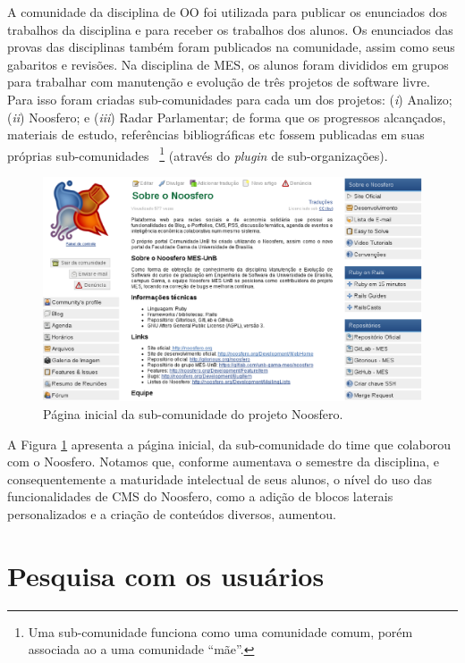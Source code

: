 A comunidade da disciplina de OO foi utilizada para  publicar os enunciados dos
trabalhos da disciplina e para receber os trabalhos dos alunos. Os enunciados
das provas das disciplinas também foram publicados na comunidade, assim como
seus gabaritos e revisões.
%
Na disciplina de MES, os alunos foram divididos em grupos para trabalhar com
manutenção e evolução de três projetos de software livre. Para isso foram
criadas sub-comunidades para cada um dos projetos:
%
(\textit{i}) Analizo;
(\textit{ii}) Noosfero;
e (\textit{iii}) Radar Parlamentar;
%
de forma que os progressos alcançados, materiais de estudo, referências
bibliográficas etc fossem publicadas em suas próprias sub-comunidades%
~\footnote{Uma sub-comunidade funciona como uma comunidade comum, porém
associada ao a uma comunidade ``mãe''.} (através do \textit{plugin} de
sub-organizações).

\begin{figure}[h!]
    \centering
    \includegraphics[keepaspectratio=true,scale=0.35]
      {figuras/Noosfero-MES.eps}
    \caption{Página inicial da sub-comunidade do projeto Noosfero.}
    \label{mes-noosfero}
\end{figure}

A Figura \ref{mes-noosfero} apresenta a página inicial,  da sub-comunidade do
time que colaborou com o Noosfero. Notamos que, conforme aumentava o semestre da
disciplina, e consequentemente a maturidade intelectual de seus alunos, o nível
do uso das funcionalidades de CMS do Noosfero, como a adição de blocos
laterais personalizados e a criação de conteúdos diversos, aumentou.

\section{Pesquisa com os usuários}

